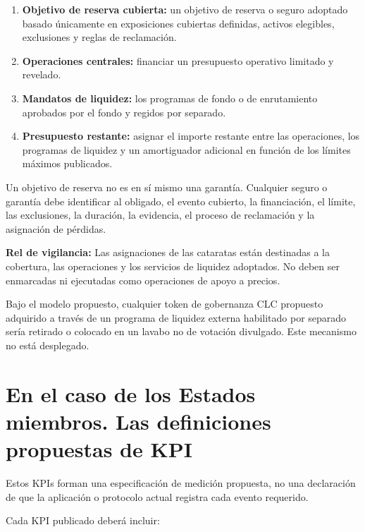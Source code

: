 \documentclass[11pt]{article}
\begin{document}
\begin{enumerate}[leftmargin=*]
\item \textbf{Objetivo de reserva cubierta:} un objetivo de reserva o seguro adoptado basado únicamente en exposiciones cubiertas definidas, activos elegibles, exclusiones y reglas de reclamación.
\item \textbf{Operaciones centrales:} financiar un presupuesto operativo limitado y revelado.
\item \textbf{Mandatos de liquidez:} los programas de fondo o de enrutamiento aprobados por el fondo y regidos por separado.
\item \textbf{Presupuesto restante:} asignar el importe restante entre las operaciones, los programas de liquidez y un amortiguador adicional en función de los límites máximos publicados.
\end{enumerate}
Un objetivo de reserva no es en sí mismo una garantía. Cualquier seguro o garantía debe identificar al obligado, el evento cubierto, la financiación, el límite, las exclusiones, la duración, la evidencia, el proceso de reclamación y la asignación de pérdidas.

\textbf{Rel de vigilancia:} Las asignaciones de las cataratas están destinadas a la cobertura, las operaciones y los servicios de liquidez adoptados. No deben ser enmarcadas ni ejecutadas como operaciones de apoyo a precios.

Bajo el modelo propuesto, cualquier token de gobernanza CLC propuesto adquirido a través de un programa de liquidez externa habilitado por separado sería retirado o colocado en un lavabo no de votación divulgado. Este mecanismo no está desplegado.


\section*{En el caso de los Estados miembros. Las definiciones propuestas de KPI}

Estos KPIs forman una especificación de medición propuesta, no una declaración de que la aplicación o protocolo actual registra cada evento requerido.

Cada KPI publicado deberá incluir:
\end{document}
